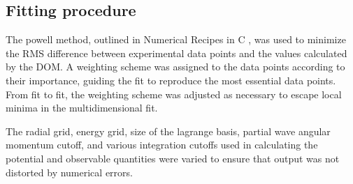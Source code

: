 \subsection{Fitting procedure}
The powell method, outlined in Numerical Recipes in C \cite{NumericalRecipes},
was used to minimize the RMS difference between experimental data points and the
values calculated by the DOM. A weighting scheme was assigned to the data points
according to their importance, guiding the fit to reproduce the most essential
data points. From fit to fit, the weighting scheme was adjusted as necessary to
escape local minima in the multidimensional fit.

The radial grid, energy grid, size of the lagrange basis, partial wave angular momentum cutoff, and
various integration cutoffs used in calculating the potential and
observable quantities were varied to ensure that output was not distorted by numerical errors. 

\afterpage{\clearpage}
